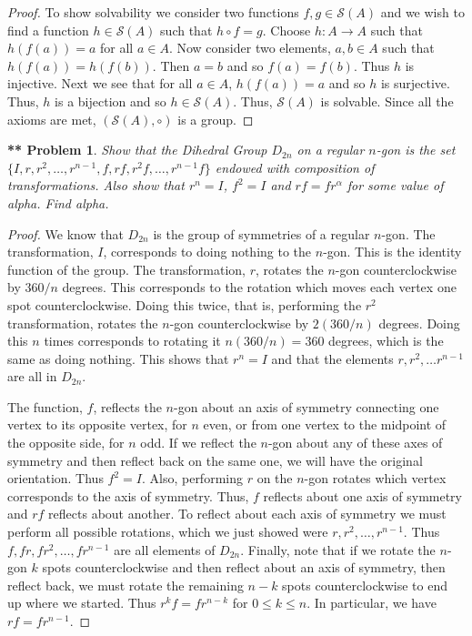\documentclass{article}
\newtheorem{**}{** Problem}
\begin{document}
\begin{flushleft}
\begin{proof}
To show solvability we consider two functions $f,g \in \mathcal{S}(A)$ and we wish to find a function $h \in \mathcal{S}(A)$ such that $h \circ f = g$. Choose $h : A \rightarrow A$ such that $h(f(a)) = a$ for all $a \in A$. Now consider two elements, $a,b \in A$ such that $h(f(a)) = h(f(b))$. Then $a = b$ and so $f(a) = f(b)$. Thus $h$ is injective. Next we see that for all $a \in A$, $h(f(a)) = a$ and so $h$ is surjective. Thus, $h$ is a bijection and so $h \in \mathcal{S}(A)$. Thus, $\mathcal{S}(A)$ is solvable. Since all the axioms are met, $(\mathcal{S}(A), \circ)$ is a group.
\end{proof}

\begin{**}
Show that the Dihedral Group $D_{2n}$ on a regular $n$-gon is the set $\{I, r, r^2, \dots , r^{n-1}, f, rf, r^2f, \dots , r^{n-1}f\}$ endowed with composition of transformations. Also show that $r^n = I$, $f^2 = I$ and $rf = fr^{\alpha}$ for some value of alpha. Find alpha.
\end{**}
\begin{proof}
We know that $D_{2n}$ is the group of symmetries of a regular $n$-gon. The transformation, $I$, corresponds to doing nothing to the $n$-gon. This is the identity function of the group. The transformation, $r$, rotates the $n$-gon counterclockwise by $360/n$ degrees. This corresponds to the rotation which moves each vertex one spot counterclockwise. Doing this twice, that is, performing the $r^2$ transformation, rotates the $n$-gon counterclockwise by $2(360/n)$ degrees. Doing this $n$ times corresponds to rotating it $n(360/n) = 360$ degrees, which is the same as doing nothing. This shows that $r^n = I$ and that the elements $r, r^2, \dots r^{n-1}$ are all in $D_{2n}$.\newline

The function, $f$, reflects the $n$-gon about an axis of symmetry connecting one vertex to its opposite vertex, for $n$ even, or from one vertex to the midpoint of the opposite side, for $n$ odd. If we reflect the $n$-gon about any of these axes of symmetry and then reflect back on the same one, we will have the original orientation. Thus $f^2 = I$. Also, performing $r$ on the $n$-gon rotates which vertex corresponds to the axis of symmetry. Thus, $f$ reflects about one axis of symmetry and $rf$ reflects about another. To reflect about each axis of symmetry we must perform all possible rotations, which we just showed were $r, r^2, \dots , r^{n-1}$. Thus $f, fr, fr^2, \dots , fr^{n-1}$ are all elements of $D_{2n}$. Finally, note that if we rotate the $n$-gon $k$ spots counterclockwise and then reflect about an axis of symmetry, then reflect back, we must rotate the remaining $n-k$ spots counterclockwise to end up where we started. Thus $r^kf = fr^{n-k}$ for $0 \leq k \leq n$. In particular, we have $rf = fr^{n-1}$.
\end{proof}

\end{flushleft}
\end{document}

